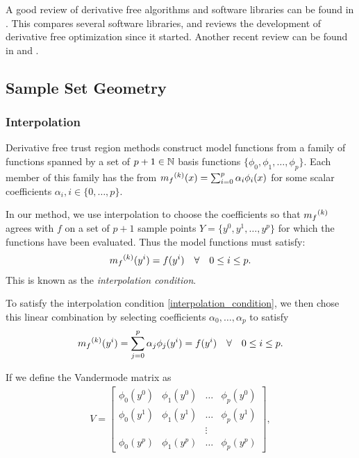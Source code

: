 A good review of derivative free algorithms and software libraries can be found in \cite{DUMMY:review}.
This compares several software libraries, and reviews the development of derivative free optimization since it started.
Another recent review can be found in \cite{DUMMY:review2} and \cite{Larson_2019}.


\subsection{Sample Set Geometry}
\subsubsection{Interpolation}
\label{interpolation}

Derivative free trust region methods construct model functions from a family of functions spanned by a set of $p + 1 \in \mathbb N$ basis functions  $\{\phi_0, \phi_1, \ldots, \phi_p\}$.
Each member of this family has the from ${{m}_f}^{(k)}(x) = \sum_{i=0}^p\alpha_i\phi_i(x)$ for some scalar coefficients $\alpha_i, i \in \{0, \ldots, p\}$.

In our method, we use interpolation to choose the coefficients so that ${{m}_f}^{(k)}$ agrees with $f$ on a set of $p+1$ sample points $Y = \{y^0, y^1, \ldots, y^p\}$ for which the functions have been evaluated.
Thus the model functions must satisfy:
\begin{align}
\label{interpolation_condition}
{{m}_f}^{(k)}(y^i) = f(y^i) \quad \forall \quad 0 \le i \le p.
\end{align}
This is known as the \emph{interpolation condition}.

To satisfy the interpolation condition \cref{interpolation_condition}, we then chose this linear combination by selecting coefficients $\alpha_0, \ldots, \alpha_p$ to satisfy
\begin{align}
\label{interpolation_formula}
    {{m}_f}^{(k)}(y^i) = \sum^p_{j=0}\alpha_j\phi_j(y^i) = f(y^i) \quad \forall \quad 0 \le i \le p.
\end{align}

If we define the Vandermode matrix as
\begin{align}
\label{vandermonde}
V=
\begin{bmatrix}
    \phi_0(y^0)      & \phi_1(y^0)       & \ldots & \phi_{p}(y^0)      \\
    \phi_0(y^1)      & \phi_1(y^1)       & \dots  & \phi_{p}(y^1)      \\
                     &                   & \vdots &                    \\
    \phi_0(y^{p})    & \phi_1(y^{p})     & \ldots & \phi_{p}(y^{p})
\end{bmatrix},
\end{align}

